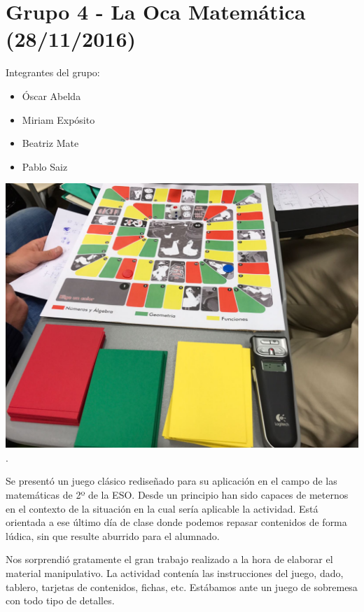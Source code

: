 \section*{Grupo 4 - La Oca Matemática (28/11/2016)}

Integrantes del grupo:

\begin{itemize}

\item Óscar Abelda
\item Miriam Expósito
\item Beatriz Mate
\item Pablo Saiz
\end{itemize}

\begin{minipage}[hbtp]{1.0\linewidth}
\centering
\includegraphics[scale=0.2]{img/grupo4_1.jpg}
.
\end{minipage}

Se presentó un juego clásico rediseñado para su aplicación en el campo de las matemáticas de 2º de la ESO. Desde un principio han sido capaces de meternos en el contexto de la situación en la cual sería aplicable la actividad. Está orientada a ese último día de clase donde podemos repasar contenidos de forma lúdica, sin que resulte aburrido para el alumnado. 

Nos sorprendió gratamente el gran trabajo realizado a la hora de elaborar el material manipulativo. La actividad contenía las instrucciones del juego, dado, tablero, tarjetas de contenidos, fichas, etc. Estábamos ante un juego de sobremesa con todo tipo de detalles.

